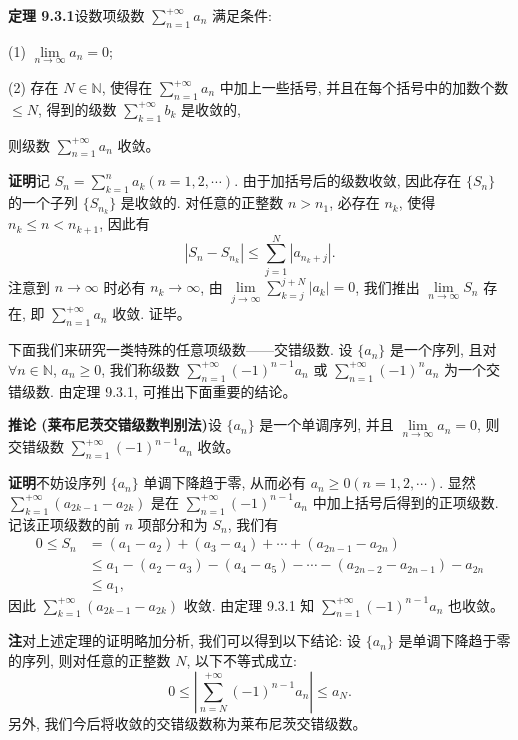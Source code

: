 \documentclass[UTF8, 12pt, fontset=fandol, oneside]{ctexart}
\begin{document}
\noindent\textbf{定理 9.3.1}\quad 设数项级数 $\sum\limits_{n=1}^{+\infty}a_n$ 满足条件:

(1) $\lim\limits_{n\to\infty}a_n=0$;

(2) 存在 $N\in\mathbb{N}$, 使得在 $\sum\limits_{n=1}^{+\infty}a_n$ 中加上一些括号, 并且在每个括号中的加数个数 $\leq N$, 得到的级数 $\sum\limits_{k=1}^{+\infty}b_k$ 是收敛的,

则级数 $\sum\limits_{n=1}^{+\infty}a_n$ 收敛。

\noindent\textbf{证明}\quad 记 $S_n=\sum\limits_{k=1}^n a_k(n=1,2,\cdots)$. 由于加括号后的级数收敛, 因此存在 $\{S_n\}$ 的一个子列 $\{S_{n_k}\}$ 是收敛的. 对任意的正整数 $n>n_1$, 必存在 $n_k$, 使得 $n_k\leq n<n_{k+1}$, 因此有
\[
  |S_n-S_{n_k}|\leq\sum_{j=1}^N|a_{n_k+j}|.
\]
注意到 $n\to\infty$ 时必有 $n_k\to\infty$, 由 $\lim\limits_{j\to\infty}\sum\limits_{k=j}^{j+N}|a_k|=0$, 我们推出 $\lim\limits_{n\to\infty}S_n$ 存在, 即 $\sum\limits_{n=1}^{+\infty}a_n$ 收敛. 证毕。

下面我们来研究一类特殊的任意项级数——交错级数. 设 $\{a_n\}$ 是一个序列, 且对 $\forall n\in\mathbb{N}$, $a_n\geq0$, 我们称级数 $\sum\limits_{n=1}^{+\infty}(-1)^{n-1}a_n$ 或 $\sum\limits_{n=1}^{+\infty}(-1)^na_n$ 为一个交错级数. 由定理 9.3.1, 可推出下面重要的结论。

\noindent\textbf{推论 (莱布尼茨交错级数判别法)}\quad 设 $\{a_n\}$ 是一个单调序列, 并且 $\lim\limits_{n\to\infty}a_n=0$, 则交错级数 $\sum\limits_{n=1}^{+\infty}(-1)^{n-1}a_n$ 收敛。

\noindent\textbf{证明}\quad 不妨设序列 $\{a_n\}$ 单调下降趋于零, 从而必有 $a_n\geq0(n=1,2,\cdots)$. 显然 $\sum\limits_{k=1}^{+\infty}(a_{2k-1}-a_{2k})$ 是在 $\sum\limits_{n=1}^{+\infty}(-1)^{n-1}a_n$ 中加上括号后得到的正项级数. 记该正项级数的前 $n$ 项部分和为 $S_n$, 我们有
\[
\begin{aligned}
  0\leq S_n
  &=(a_1-a_2)+(a_3-a_4)+\cdots+(a_{2n-1}-a_{2n})\\
  &\leq a_1-(a_2-a_3)-(a_4-a_5)-\cdots-(a_{2n-2}-a_{2n-1})-a_{2n}\\
  &\leq a_1,
\end{aligned}
\]
因此 $\sum\limits_{k=1}^{+\infty}(a_{2k-1}-a_{2k})$ 收敛. 由定理 9.3.1 知 $\sum\limits_{n=1}^{+\infty}(-1)^{n-1}a_n$ 也收敛。

\noindent\textbf{注}\quad 对上述定理的证明略加分析, 我们可以得到以下结论: 设 $\{a_n\}$ 是单调下降趋于零的序列, 则对任意的正整数 $N$, 以下不等式成立:
\[
  0\leq\left|\sum_{n=N}^{+\infty}(-1)^{n-1}a_n\right|\leq a_N.
\]
另外, 我们今后将收敛的交错级数称为莱布尼茨交错级数。
\end{document}
